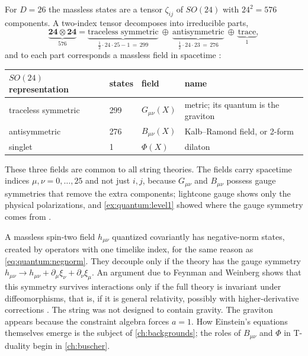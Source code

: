 For $D=26$ the massless states are a tensor $\zeta_{ij}$ of $SO(24)$ with $24^2=576$
components. A two-index tensor decomposes into irreducible parts,
\begin{equation}\label{eq:quantum:decomp}
 \underbrace{\mathbf{24}\otimes\mathbf{24}}_{576}
 =\underbrace{\text{traceless symmetric}}_{\frac12\cdot24\cdot25-1\,=\,299}
 \ \oplus\ \underbrace{\text{antisymmetric}}_{\frac12\cdot24\cdot23\,=\,276}
 \ \oplus\ \underbrace{\text{trace}}_{1},
\end{equation}
and to each part corresponds a massless field in spacetime
:
\begin{center}
\begin{tabular}{@{}llll@{}}\toprule
$SO(24)$ representation & states & field & name\\\midrule
traceless symmetric & 299 & $G_{\mu\nu}(X)$ & metric; its quantum is the graviton\index{graviton}\\
antisymmetric & 276 & $B_{\mu\nu}(X)$ & Kalb--Ramond field, or 2-form\index{Kalb--Ramond field}\\
singlet & 1 & $\Phi(X)$ & dilaton\index{dilaton}\\\bottomrule
\end{tabular}
\end{center}
These three fields are common to all string theories. The fields carry spacetime indices
$\mu,\nu=0,\dots,25$ and not just $i,j$, because $G_{\mu\nu}$ and $B_{\mu\nu}$ possess gauge
symmetries that remove the extra components; lightcone gauge shows only the physical
polarizations, and \cref{ex:quantum:level1} showed where the gauge symmetry comes from
.

\begin{physicsbox}
A massless spin-two field $h_{\mu\nu}$ quantized covariantly has negative-norm states,
created by operators with one timelike index, for the same reason as
\cref{eq:quantum:negnorm}. They decouple only if the theory has the gauge symmetry
$h_{\mu\nu}\to h_{\mu\nu}+\partial_\mu\xi_\nu+\partial_\nu\xi_\mu$. An argument due to Feynman
and Weinberg shows that this symmetry survives interactions only if the full theory is
invariant under diffeomorphisms, that is, if it is general relativity, possibly with
higher-derivative corrections . The string was not
designed to contain gravity. The graviton appears because the constraint algebra forces
$a=1$. How Einstein's equations themselves emerge is the subject of \cref{ch:backgrounds};
the roles of $B_{\mu\nu}$ and $\Phi$ in T-duality begin in \cref{ch:buscher}.
\end{physicsbox}

